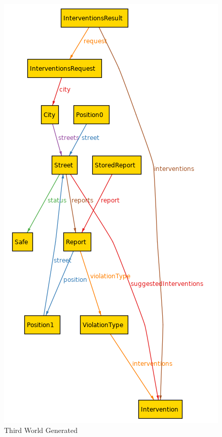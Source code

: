 	\begin{figure}[h!]
		\centering
		\includegraphics[scale=0.59]{Files/alloy/world3.png}
		\caption{\label{fig:thirdWorld}Third World Generated}
	\end{figure}
	